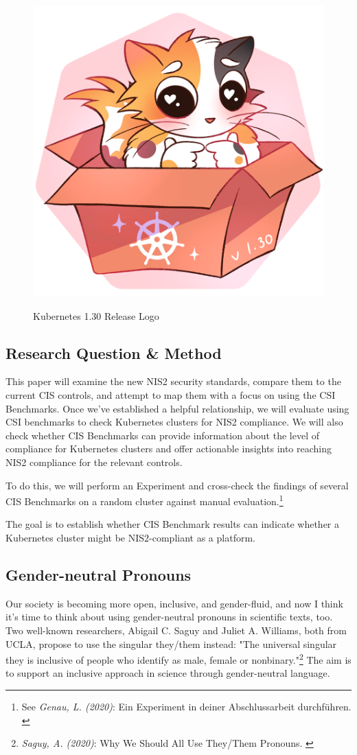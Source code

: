 \begin{figure}[H]
\centering
\caption {Kubernetes 1.30 Release Logo}
\includegraphics[width=0.3\linewidth]{images/k8s-1.30.png}
\label{fig:uwubernetes}
\end{figure}

\subsection{Research Question \& Method}

This paper will examine the new NIS2 security standards, compare them to the current CIS controls, and attempt to map them with a focus on using the CSI Benchmarks. Once we've established a helpful relationship, we will evaluate using CSI benchmarks to check Kubernetes clusters for NIS2 compliance. We will also check whether CIS Benchmarks can provide information about the level of compliance for Kubernetes clusters and offer actionable insights into reaching NIS2 compliance for the relevant controls.

To do this, we will perform an Experiment and cross-check the findings of several CIS Benchmarks on a random cluster against manual evaluation.\footnote{See \textit{Genau, L. (2020)}: Ein Experiment in deiner Abschlussarbeit durchführen. \cite{expScribbr}}

The goal is to establish whether CIS Benchmark results can indicate whether a Kubernetes cluster might be NIS2-compliant as a platform.

\subsection{Gender-neutral Pronouns}

Our society is becoming more open, inclusive, and gender-fluid, and now I think it's time to think about using gender-neutral pronouns in scientific texts, too. Two well-known researchers, Abigail C. Saguy and Juliet A. Williams, both from UCLA, propose to use the singular they/them instead: "The universal singular they is inclusive of people who identify as male, female or nonbinary."\footnote{\textit{Saguy, A. (2020)}: Why We Should All Use They/Them Pronouns. \cite{pronouns}} The aim is to support an inclusive approach in science through gender-neutral language. 

